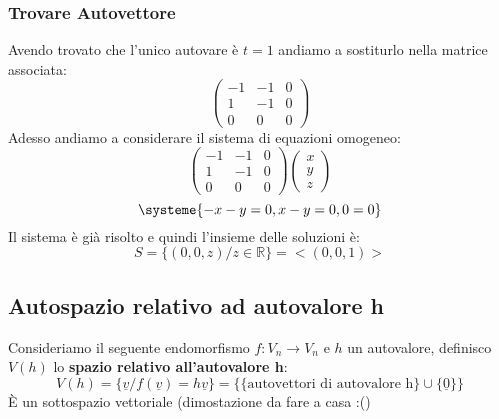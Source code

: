 \subsubsection{Trovare Autovettore}
Avendo trovato che l'unico autovare è $t=1$ andiamo a sostiturlo nella matrice associata:
$$
\begin{pmatrix}
-1 & -1 & 0 \\ 1 & -1 & 0 \\ 0 & 0 & 0 
\end{pmatrix}
$$
Adesso andiamo a considerare il sistema di equazioni omogeneo:
$$ 
\begin{pmatrix}
-1 & -1 & 0 \\ 1 & -1 & 0 \\ 0 & 0 & 0 
\end{pmatrix}
\begin{pmatrix}
x \\ y \\ z
\end{pmatrix}
$$
$$
\systeme{-x-y=0, x-y=0, 0=0}
$$
Il sistema è già risolto e quindi l'insieme delle soluzioni è:
$$ 
S = \{(0,0,z)/ z \in \mathbb{R} \} = <(0,0,1)>
$$

\subsection{Autospazio relativo ad autovalore h}
Consideriamo il seguente endomorfismo $f: V_n \rightarrow V_n$ e $h$ un autovalore, definisco $V(h)$ lo \textbf{spazio relativo all'autovalore h}:
$$ V(h) = \{\underline{v}/f(\underline{v}) = h\underline{v}\} = 
\{\{\text{autovettori di autovalore h} \} \cup \{\underline{0}\} \} 
$$
È un sottospazio vettoriale (dimostazione da fare a casa :()
